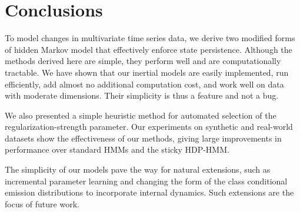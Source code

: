 \documentclass[letterpaper]{article}
\begin{document}
\section{Conclusions}
\vspace{-0.2cm}
To model changes in multivariate time series data, we derive two modified forms of hidden Markov model that effectively enforce state persistence. Although the methods derived here are simple, they perform well and are computationally tractable. We have shown that our inertial models are easily implemented, run efficiently, add almost no additional computation cost, and work well on data with moderate dimensions. Their simplicity is thus a feature and not a bug. 

We also presented a simple heuristic method for automated selection of the regularization-strength parameter. Our experiments on synthetic and real-world datasets show the effectiveness of our methods, giving large improvements in performance over standard HMMs and the sticky HDP-HMM.

The simplicity of our models pave the way for natural extensions, such as incremental parameter learning and changing the form of the class conditional emission distributions to incorporate internal dynamics. Such extensions are the focus of future work.

\vspace{-0.5cm}


\end{document}

